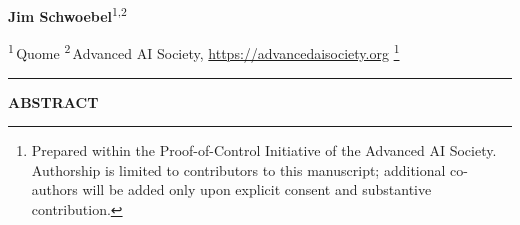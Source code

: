 \documentclass[11pt]{article}
\begin{document}
{\small\noindent
\textbf{Jim Schwoebel}\textsuperscript{1,2}

\smallskip\noindent
{\footnotesize
\textsuperscript{1}\,Quome \quad
\textsuperscript{2}\,Advanced AI Society, \url{https://advancedaisociety.org}%
\footnote{Prepared within the Proof-of-Control Initiative of the Advanced AI
Society. Authorship is limited to contributors to this manuscript; additional
co-authors will be added only upon explicit consent and substantive
contribution.}}}

\vspace{0.9em}
\noindent\textcolor{aailime}{\rule{\textwidth}{1.6pt}}
\vspace{0.2em}

\begin{center}
{\sffamily\bfseries\small ABSTRACT}
\end{center}
\vspace{-0.5em}
\end{document}
